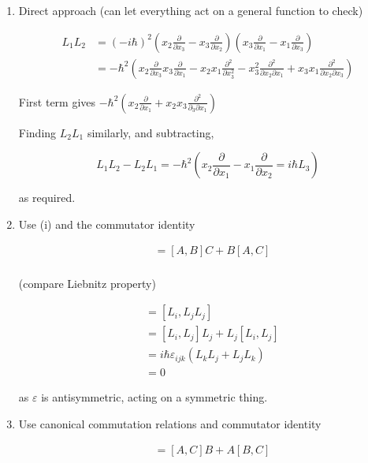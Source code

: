 \documentclass[a4paper]{article}
\begin{document}
\begin{enumerate}
	\item Direct approach (can let everything act on a general function to check)
	
	\begin{align*}
	L_{1}L_{2}& =  (-i \hbar)^{2} \left(  x_{2} \frac{\partial }{\partial x_{3}}  - x_{3} \frac{\partial }{\partial x_{2}}  \right) \left(  x_{3} \frac{\partial }{\partial x_{1}} - x_{1} \frac{\partial }{\partial x_{3}} \right)    \\
	& = -\hbar^{2} \left(   x_{2} \frac{\partial }{\partial x_{3}} x_{3} \frac{\partial }{\partial x_{1}}  - x_{2}x_{1} \frac{\partial^{2} }{\partial x_{3}^{2}}   - x_{3}^{2} \frac{\partial^{2} }{\partial x_{2} \partial x_{1}}  + x_{3}x_{1} \frac{\partial^{2} }{\partial x_{2} \partial x_{3} }  \right)  
	\end{align*} 


First term gives $ - \hbar^{2}  \left(   x_{2} \frac{\partial }{\partial x_{1}}  + x_{2}x_{3}  \frac{\partial^{2} }{\partial_{3} \partial x_{1} }   \right)   $

Finding $ L_{2}L_{1} $ similarly, and subtracting,

\[ L_{1}L_{2} - L_{2}L_{1} = - \hbar^{2} \left(   x_{2}\frac{\partial }{\partial x_{1}} - x_{1} \frac{\partial }{\partial x_{2}} = i \hbar L_{3} \right)   \]

as required. 

\item Use (i) and the commutator identity

\begin{align*}
[A,B,C] & = [A,B] C + B[A,C] \\
\end{align*}

(compare Liebnitz property)

\begin{align*}
[L_{i},\mathbf{L}^{2}] & = [L_{i},L_{j}L_{j}] \\
& = [L_{i},L_{j}]L_{j} + L_{j}[L_{i},L_{j}] \\
& = i \hbar \varepsilon_{ijk} (   L_{k}L_{j} + L_{j}L_{k}  ) \\
& = 0
\end{align*}

as $ \varepsilon $ is antisymmetric, acting on a symmetric thing. 

\item Use canonical commutation relations and commutator identity

\begin{align*}
[AB,C] & =  [A,C] B + A[B,C] \\
\end{align*}


\end{enumerate}
\end{document}
